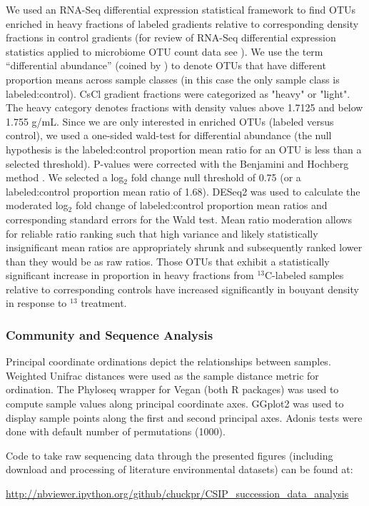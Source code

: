 We used an RNA-Seq differential expression statistical framework
\citep{Love_2014} to find OTUs enriched in heavy fractions of labeled
gradients relative to corresponding density fractions in control gradients
(for review of RNA-Seq differential expression statistics applied to
microbiome OTU count data see \citet{24699258}). We use the term
“differential abundance” (coined by \citet{24699258}) to denote OTUs that
have different proportion means across sample classes (in this case the only
sample class is labeled:control).  CsCl gradient fractions were categorized
as "heavy" or "light". The heavy category denotes fractions with density
values above 1.7125 and below 1.755 g/mL. Since we are only interested in enriched OTUs
(labeled versus control), we used a one-sided wald-test for differential
abundance (the null hypothesis is the labeled:control proportion mean ratio
for an OTU is less than a selected threshold). P-values were corrected with
the Benjamini and Hochberg method \citep{citeulike:1042553}. We selected a
log$_{2}$ fold change null threshold of 0.75 (or a labeled:control proportion
mean ratio of 1.68). DESeq2 was used to calculate the moderated log$_{2}$
fold change of labeled:control proportion mean ratios and corresponding
standard errors for the Wald test. Mean ratio moderation allows for reliable ratio ranking such
that high variance and likely statistically insignificant mean ratios are
appropriately shrunk and subsequently ranked lower than they would be as raw
ratios. Those OTUs that exhibit a statistically significant increase in
proportion in heavy fractions from $^{13}$C-labeled samples relative to
corresponding controls have increased significantly in bouyant density in
response to $^{13}$ treatment.

\subsubsection{Community and Sequence Analysis}
Principal coordinate ordinations depict the relationships between
samples. Weighted Unifrac distances were
used as the sample distance metric for ordination. The Phyloseq
\citep{24699258} wrapper for Vegan \citep{vegan} (both R packages) was
used to compute sample values along principal coordinate axes. GGplot2
\citep{ggplot2} was used to display sample points along the first and
second principal axes. Adonis tests \cite{Anderson_2001} were done with default
number of permutations (1000).

Code to take raw sequencing data through the presented figures (including
download and processing of literature environmental datasets) can be
found at:

\url{http://nbviewer.ipython.org/github/chuckpr/CSIP_succession_data_analysis}